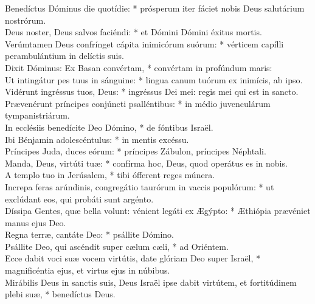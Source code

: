 {	Benedíctus Dóminus die quotídie: * prósperum iter fáciet nobis Deus salutárium nostrórum. \\
	Deus noster, Deus salvos faciéndi: * et Dómini Dómini éxitus mortis. \\
	Verúmtamen Deus confrínget cápita inimicórum suórum: * vérticem capílli perambulántium in delíctis suis. \\
	Dixit Dóminus: Ex Basan convértam, * convértam in profúndum maris: \\
	Ut intingátur pes tuus in sánguine: * lingua canum tuórum ex inimícis, ab ipso. \\
	Vidérunt ingréssus tuos, Deus: * ingréssus Dei mei: regis mei qui est in sancto. \\
	Prævenérunt príncipes conjúncti psalléntibus: * in médio juvenculárum tympanistriárum. \\
	In ecclésiis benedícite Deo Dómino, * de fóntibus Israël. \\
	Ibi Bénjamin adolescéntulus: * in mentis excéssu. \\
	Príncipes Juda, duces eórum: * príncipes Zábulon, príncipes Néphtali. \\
	Manda, Deus, virtúti tuæ: * confírma hoc, Deus, quod operátus es in nobis. \\
	A templo tuo in Jerúsalem, * tibi ófferent reges múnera. \\
	Increpa feras arúndinis, congregátio taurórum in vaccis populórum: * ut exclúdant eos, qui probáti sunt argénto. \\
	Díssipa Gentes, quæ bella volunt: vénient legáti ex Ægýpto: * Æthiópia prævéniet manus ejus Deo. \\
	Regna terræ, cantáte Deo: * psállite Dómino. \\
	Psállite Deo, qui ascéndit super cælum cæli, * ad Oriéntem. \\
	Ecce dabit voci suæ vocem virtútis, date glóriam Deo super Israël, * magnificéntia ejus, et virtus ejus in núbibus. \\
	Mirábilis Deus in sanctis suis, Deus Israël ipse dabit virtútem, et fortitúdinem plebi suæ, * benedíctus Deus. \\
}

